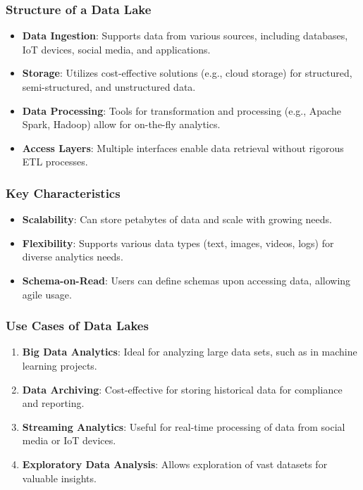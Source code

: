 \documentclass[aspectratio=169]{beamer}
\begin{document}
\begin{frame}[fragile]
    \frametitle{Structure of a Data Lake}
    \begin{itemize}
        \item \textbf{Data Ingestion}: Supports data from various sources, including databases, IoT devices, social media, and applications.
        \item \textbf{Storage}: Utilizes cost-effective solutions (e.g., cloud storage) for structured, semi-structured, and unstructured data.
        \item \textbf{Data Processing}: Tools for transformation and processing (e.g., Apache Spark, Hadoop) allow for on-the-fly analytics.
        \item \textbf{Access Layers}: Multiple interfaces enable data retrieval without rigorous ETL processes.
    \end{itemize}
\end{frame}

\begin{frame}[fragile]
    \frametitle{Key Characteristics}
    \begin{itemize}
        \item \textbf{Scalability}: Can store petabytes of data and scale with growing needs.
        \item \textbf{Flexibility}: Supports various data types (text, images, videos, logs) for diverse analytics needs.
        \item \textbf{Schema-on-Read}: Users can define schemas upon accessing data, allowing agile usage.
    \end{itemize}
\end{frame}

\begin{frame}[fragile]
    \frametitle{Use Cases of Data Lakes}
    \begin{enumerate}
        \item \textbf{Big Data Analytics}: Ideal for analyzing large data sets, such as in machine learning projects.
        \item \textbf{Data Archiving}: Cost-effective for storing historical data for compliance and reporting.
        \item \textbf{Streaming Analytics}: Useful for real-time processing of data from social media or IoT devices.
        \item \textbf{Exploratory Data Analysis}: Allows exploration of vast datasets for valuable insights.
    \end{enumerate}
\end{frame}
\end{document}
